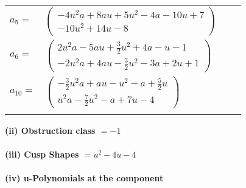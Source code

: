\documentclass[1p]{elsarticle_modified}
\theoremstyle{definition}
\begin{document}
\begin{tabular}{m{7pt} m{180pt} m{7pt} m{180pt} }
\flushright $a_{5}=$&$\begin{pmatrix}-4 u^2 a+8 a u+5 u^2-4 a-10 u+7\\-10 u^2+14 u-8\end{pmatrix}$ \\
\flushright $a_{6}=$&$\begin{pmatrix}2 u^2 a-5 a u+\frac{3}{2} u^2+4 a- u-1\\-2 u^2 a+4 a u-\frac{3}{2} u^2-3 a+2 u+1\end{pmatrix}$ \\
\flushright $a_{10}=$&$\begin{pmatrix}-\frac{3}{2} u^2 a+a u- u^2- a+\frac{5}{2} u\\u^2 a-\frac{7}{2} u^2- a+7 u-4\end{pmatrix}$\\&\end{tabular}
\flushleft \textbf{(ii) Obstruction class $= -1$}\\~\\
\flushleft \textbf{(iii) Cusp Shapes $= u^2-4 u-4$}\\~\\
\newpage\renewcommand{\arraystretch}{1}
\flushleft \textbf{(iv) u-Polynomials at the component}\newline \\
\end{document}
